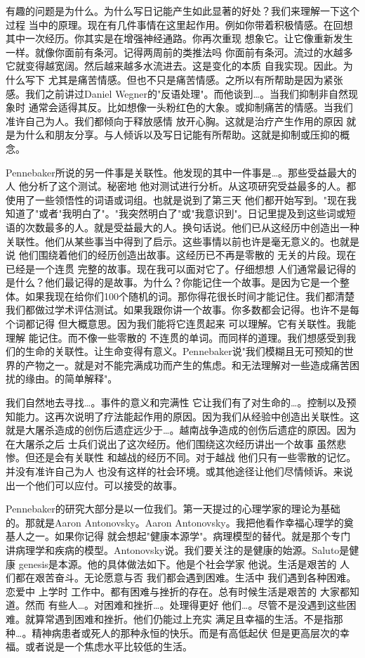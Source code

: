 有趣的问题是为什么。为什么写日记能产生如此显著的好处？我们来理解一下这个过程 当中的原理。现在有几件事情在这里起作用。例如你带着积极情感。在回想其中一次经历。你其实是在增强神经通路。你再次重现 想象它。让它像重新发生一样。就像你面前有条河。记得两周前的类推法吗 你面前有条河。流过的水越多 它就变得越宽阔。然后越来越多水流进去。这是变化的本质 自我实现。因此。为什么写下 尤其是痛苦情感。但也不只是痛苦情感。之所以有所帮助是因为紧张感。我们之前讲过Daniel Wegner的"反语处理"。而他谈到…。当我们抑制非自然现象时 通常会适得其反。比如想像一头粉红色的大象。或抑制痛苦的情感。当我们准许自己为人。我们都倾向于释放感情 放开心胸。这就是治疗产生作用的原因 就是为什么和朋友分享。与人倾诉以及写日记能有所帮助。这就是抑制或压抑的概念。 

Pennebaker所说的另一件事是关联性。他发现的其中一件事是…。那些受益最大的人 他分析了这个测试。秘密地 他对测试进行分析。从这项研究受益最多的人。都使用了一些领悟性的词语或词组。也就是说到了第三天 他们都开始写到。"现在我知道了"或者"我明白了"。"我突然明白了"或"我意识到"。日记里提及到这些词或短语的次数最多的人。就是受益最大的人。换句话说。他们已从这经历中创造出一种关联性。他们从某些事当中得到了启示。这些事情以前也许是毫无意义的。也就是说 他们围绕着他们的经历创造出故事。这经历已不再是零散的 无关的片段。现在已经是一个连贯 完整的故事。现在我可以面对它了。仔细想想 人们通常最记得的是什么？他们最记得的是故事。为什么？你能记住一个故事。是因为它是一个整体。如果我现在给你们100个随机的词。那你得花很长时间才能记住。我们都清楚 我们都做过学术评估测试。如果我跟你讲一个故事。你多数都会记得。也许不是每个词都记得 但大概意思。因为我们能将它连贯起来 可以理解。它有关联性。我能理解 能记住。而不像一些零散的 不连贯的单词。而同样的道理。我们想感受到我们的生命的关联性。让生命变得有意义。Pennebaker说"我们模糊且无可预知的世界的产物之一。就是对不能完满成功而产生的焦虑。和无法理解对一些造成痛苦困扰的缘由。的简单解释"。 

我们自然地去寻找…。事件的意义和完满性 它让我们有了对生命的…。控制以及预知能力。这再次说明了疗法能起作用的原因。因为我们从经验中创造出关联性。这就是大屠杀造成的创伤后遗症远少于…。越南战争造成的创伤后遗症的原因。因为在大屠杀之后 士兵们说出了这次经历。他们围绕这次经历讲出一个故事 虽然悲惨。但还是会有关联性 和越战的经历不同。对于越战 他们只有一些零散的记忆。并没有准许自己为人 也没有这样的社会环境。或其他途径让他们尽情倾诉。来说出一个他们可以应付。可以接受的故事。 

Pennebaker的研究大部分是以一位我们。第一天提过的心理学家的理论为基础的。那就是Aaron Antonovsky。Aaron Antonovsky。我把他看作幸福心理学的奠基人之一。如果你记得 就会想起"健康本源学"。病理模型的替代。就是那个专门讲病理学和疾病的模型。Antonovsky说。我们要关注的是健康的始源。Saluto是健康 genesis是本源。他的具体做法如下。他是个社会学家 他说。生活是艰苦的 人们都在艰苦奋斗。无论愿意与否 我们都会遇到困难。生活中 我们遇到各种困难。恋爱中 上学时 工作中。都有困难与挫折的存在。总有时候生活是艰苦的 大家都知道。然而 有些人…。对困难和挫折…。处理得更好 他们…。尽管不是没遇到这些困难。就算常遇到困难和挫折。他们仍能过上充实 满足且幸福的生活。不是指那种…。精神病患者或死人的那种永恒的快乐。而是有高低起伏 但是更高层次的幸福。或者说是一个焦虑水平比较低的生活。 

